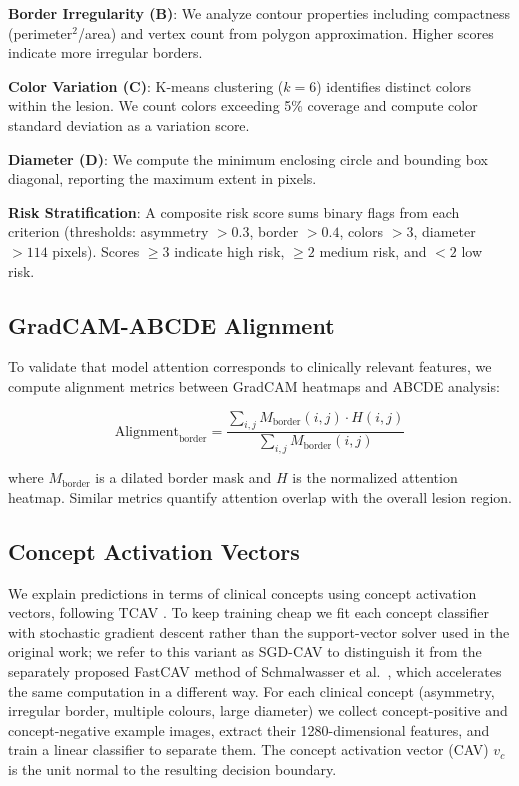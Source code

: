 \textbf{Border Irregularity (B)}: We analyze contour properties including
compactness (perimeter$^2$/area) and vertex count from polygon approximation.
Higher scores indicate more irregular borders.

\textbf{Color Variation (C)}: K-means clustering ($k=6$) identifies distinct
colors within the lesion. We count colors exceeding 5\% coverage and compute
color standard deviation as a variation score.

\textbf{Diameter (D)}: We compute the minimum enclosing circle and bounding
box diagonal, reporting the maximum extent in pixels.

\textbf{Risk Stratification}: A composite risk score sums binary flags from
each criterion (thresholds: asymmetry $>0.3$, border $>0.4$, colors $>3$,
diameter $>114$ pixels). Scores $\geq3$ indicate high risk, $\geq2$ medium
risk, and $<2$ low risk.

\subsection{GradCAM-ABCDE Alignment}

To validate that model attention corresponds to clinically relevant features,
we compute alignment metrics between GradCAM heatmaps and ABCDE analysis:

\begin{equation}
    \text{Alignment}_{\text{border}} = \frac{\sum_{i,j} M_{\text{border}}(i,j)
        \cdot H(i,j)}{\sum_{i,j} M_{\text{border}}(i,j)}
\end{equation}

where $M_{\text{border}}$ is a dilated border mask and $H$ is the normalized
attention heatmap. Similar metrics quantify attention overlap with the
overall lesion region.

\subsection{Concept Activation Vectors}

We explain predictions in terms of clinical concepts using concept activation
vectors, following TCAV \cite{kim2018interpretability}. To keep training cheap
we fit each concept classifier with stochastic gradient descent rather than the
support-vector solver used in the original work; we refer to this variant as
SGD-CAV to distinguish it from the separately proposed FastCAV method of
Schmalwasser et al.\ \cite{schmalwasser2025fastcav}, which accelerates the same
computation in a different way. For each clinical concept (asymmetry, irregular border,
multiple colours, large diameter) we collect concept-positive and
concept-negative example images, extract their 1280-dimensional features, and
train a linear classifier to separate them. The concept activation vector (CAV)
$v_c$ is the unit normal to the resulting decision boundary.

